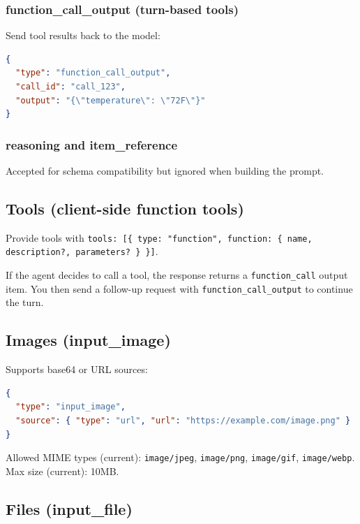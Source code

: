 \subsubsection{function\_call\_output (turn-based tools)}


Send tool results back to the model:

\begin{lstlisting}[language=json]
{
  "type": "function_call_output",
  "call_id": "call_123",
  "output": "{\"temperature\": \"72F\"}"
}
\end{lstlisting}


\subsubsection{reasoning and item\_reference}


Accepted for schema compatibility but ignored when building the prompt.

\subsection{Tools (client-side function tools)}


Provide tools with \texttt{tools: [\{ type: "function", function: \{ name, description?, parameters? \} \}]}.

If the agent decides to call a tool, the response returns a \texttt{function\_call} output item.
You then send a follow-up request with \texttt{function\_call\_output} to continue the turn.

\subsection{Images (input\_image)}


Supports base64 or URL sources:

\begin{lstlisting}[language=json]
{
  "type": "input_image",
  "source": { "type": "url", "url": "https://example.com/image.png" }
}
\end{lstlisting}


Allowed MIME types (current): \texttt{image/jpeg}, \texttt{image/png}, \texttt{image/gif}, \texttt{image/webp}.
Max size (current): 10MB.

\subsection{Files (input\_file)}


